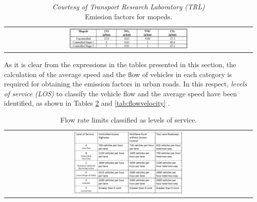 \documentclass[journal]{IEEEtran}
\begin{document}
\begin{table}[tbp]
 \centering
 \begin{center}  
  \begin{tabular}{c}
      \includegraphics[width=0.5\textwidth]{figure/tab_mopeds_ef.jpg}
  \end{tabular}
\end{center}  
\caption{\textit{Courtesy of Transport Research Laboratory (TRL)} \cite{bib:MEET001}\\ Emission factors for mopeds.}
  \label{tab:mopeds}
\end{table}
As it is clear from the expressions in the tables presented in this section, the calculation of the average speed and the flow of vehicles in each category is required for obtaining the emission factors in urban roads.
In this respect, \textit{levels of service (LOS)} to classify the vehicle flow and the average speed have been identified, as shown in Tables \ref{tab:flow} and \ref{tab:flowvelocity} \cite{bib:neuralgasindian}.
\begin{table}[tbp]
 \centering
 \begin{center}  
  \begin{tabular}{c}
      \includegraphics[width=0.45\textwidth]{figure/fig_traffic_flow.jpg}
  \end{tabular}
\end{center}  
\caption{Flow rate limits classified as levels of service.}
  \label{tab:flow}
\end{table}
\end{document}
